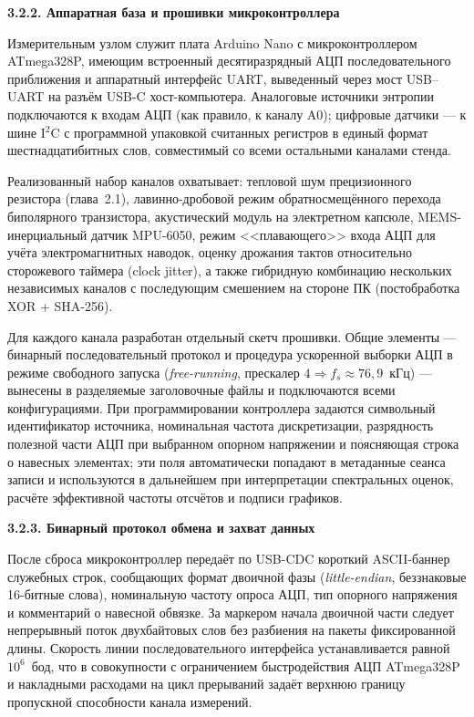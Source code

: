\textbf{3.2.2. Аппаратная база и прошивки микроконтроллера}

Измерительным узлом служит плата Arduino Nano с микроконтроллером ATmega328P,
имеющим встроенный десятиразрядный АЦП последовательного приближения и аппаратный
интерфейс UART, выведенный через мост USB--UART на разъём USB-C хост-компьютера.
Аналоговые источники энтропии подключаются к входам АЦП (как правило, к каналу A0);
цифровые датчики --- к шине I$^2$C с программной упаковкой считанных регистров в
единый формат шестнадцатибитных слов, совместимый со всеми остальными каналами стенда.

Реализованный набор каналов охватывает: тепловой шум прецизионного резистора
(глава~2.1), лавинно-дробовой режим обратносмещённого перехода биполярного транзистора,
акустический модуль на электретном капсюле, MEMS-инерциальный датчик MPU-6050,
режим <<плавающего>> входа АЦП для учёта электромагнитных наводок, оценку дрожания
тактов относительно сторожевого таймера (clock jitter), а также гибридную комбинацию
нескольких независимых каналов с последующим смешением на стороне ПК (постобработка
XOR + SHA-256).

Для каждого канала разработан отдельный скетч прошивки. Общие элементы --- бинарный
последовательный протокол и процедура ускоренной выборки АЦП в режиме свободного
запуска (\textit{free-running}, прескалер $4 \Rightarrow f_s\approx 76{,}9$~кГц) ---
вынесены в разделяемые заголовочные файлы и подключаются всеми конфигурациями. При
программировании контроллера задаются символьный идентификатор источника, номинальная
частота дискретизации, разрядность полезной части АЦП при выбранном опорном напряжении
и поясняющая строка о навесных элементах; эти поля автоматически попадают в метаданные
сеанса записи и используются в дальнейшем при интерпретации спектральных оценок,
расчёте эффективной частоты отсчётов и подписи графиков.

\textbf{3.2.3. Бинарный протокол обмена и захват данных}

После сброса микроконтроллер передаёт по USB-CDC короткий ASCII-баннер служебных строк,
сообщающих формат двоичной фазы (\textit{little-endian}, беззнаковые 16-битные слова),
номинальную частоту опроса АЦП, тип опорного напряжения и комментарий о навесной обвязке.
За маркером начала двоичной части следует непрерывный поток двухбайтовых слов без
разбиения на пакеты фиксированной длины. Скорость линии последовательного интерфейса
устанавливается равной $10^6$~бод, что в совокупности с ограничением быстродействия АЦП
ATmega328P и накладными расходами на цикл прерываний задаёт верхнюю границу пропускной
способности канала измерений.

